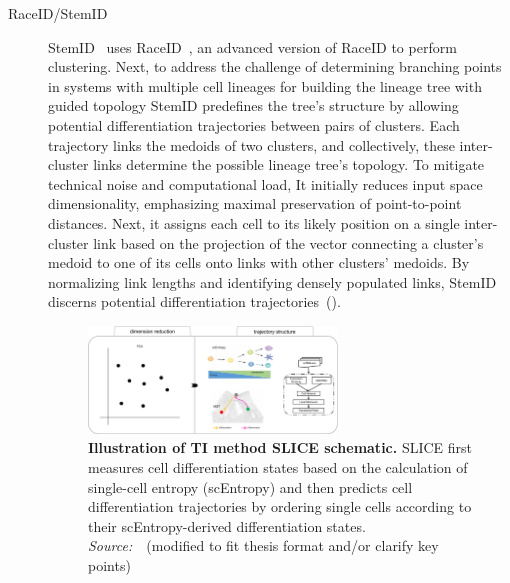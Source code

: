\begin{description}
  \item[RaceID/StemID]
  StemID~\citep{grun2016stemid} uses RaceID~\citep{grun2015raceid}, an advanced version of RaceID to perform clustering. Next, to address the challenge of determining branching points in systems with multiple cell lineages for building the lineage tree with guided topology StemID predefines the tree's structure by allowing potential differentiation trajectories between pairs of clusters. Each trajectory links the medoids of two clusters, and collectively, these inter-cluster links determine the possible lineage tree's topology. To mitigate technical noise and computational load, It initially reduces input space dimensionality, emphasizing maximal preservation of point-to-point distances. Next, it assigns each cell to its likely position on a single inter-cluster link based on the projection of the vector connecting a cluster's medoid to one of its cells onto links with other clusters' medoids. By normalizing link lengths and identifying densely populated links, StemID discerns potential differentiation trajectories~().

\begin{figure}[h!]
  	\centering
  	\includegraphics[width=0.65\textwidth]{TI_Alg_SLICE/fig}
  	\vspace{0.1cm}
  	\caption[Illustration of TI method SLICE schematic.]{\textbf{Illustration of TI method SLICE schematic.}
  	SLICE first measures cell differentiation states based on the calculation of single-cell entropy (scEntropy) and then predicts cell differentiation trajectories by ordering single cells according to their scEntropy-derived differentiation states. \emph{Source:~\cite{guo2017slice}}~(modified to fit thesis format and/or clarify key points)
  	}
  	\label{fig:TI_Alg_SLICE}
\end{figure}


\end{description}
